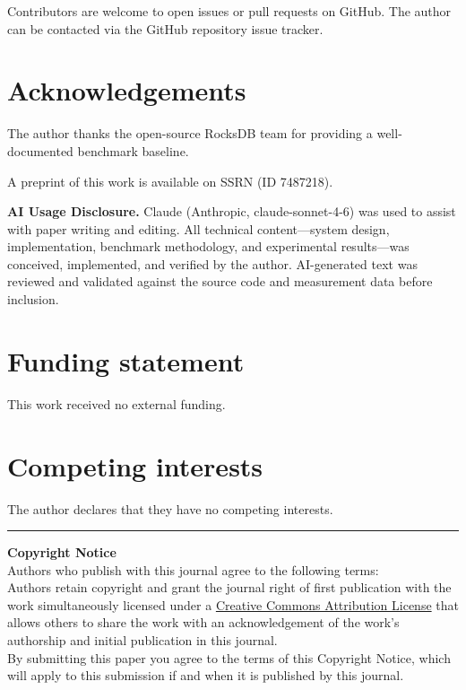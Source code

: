 \documentclass{jors}
\begin{document}
Contributors are welcome to open issues or pull requests on GitHub.
The author can be contacted via the GitHub repository issue tracker.

\section*{Acknowledgements}

The author thanks the open-source RocksDB team for providing a
well-documented benchmark baseline.

A preprint of this work is available on SSRN (ID 7487218).

\textbf{AI Usage Disclosure.} Claude (Anthropic, claude-sonnet-4-6) was
used to assist with paper writing and editing. All technical
content---system design, implementation, benchmark methodology, and
experimental results---was conceived, implemented, and verified by the
author. AI-generated text was reviewed and validated against the source
code and measurement data before inclusion.

\section*{Funding statement}

This work received no external funding.

\section*{Competing interests}

The author declares that they have no competing interests.




\vspace{2cm}

\rule{\textwidth}{1pt}

{\bf Copyright Notice} \\
Authors who publish with this journal agree to the following terms: \\

Authors retain copyright and grant the journal right of first publication
with the work simultaneously licensed under a
\href{http://creativecommons.org/licenses/by/3.0/}{Creative Commons
Attribution License} that allows others to share the work with an
acknowledgement of the work's authorship and initial publication in this
journal. \\

By submitting this paper you agree to the terms of this Copyright Notice,
which will apply to this submission if and when it is published by this
journal.
\end{document}
